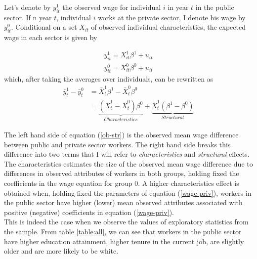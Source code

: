 \documentclass{article}
\begin{document}
\noindent
Let's denote by $y^{1}_{it}$ the observed wage for individual $i$ in year $t$ in the public sector. If n year $t$, individual $i$ works at the private sector, I denote his wage by $y^{0}_{it}$. Conditional on a set $X_{it}$ of observed individual characteristics, the expected wage in each sector is given by  

\begin{align}
    y_{it}^{1} = X_{it}^{1}\beta^{1}+u_{it}\\
    y_{it}^{0} = X_{it}^{0}\beta^{0}+u_{it} \label{wage-priv}
\end{align}
which, after taking the averages over individuals, can be rewritten as
\begin{align}
    \bar{y}_{t}^{1} - \bar{y}_{t}^{0} &= \bar{X}_{t}^{1}\beta^{1} -\bar{X}_{t}^{0}\beta^{0} \\
    &= \underbrace{\left(\bar{X}_{t}^{1}-\bar{X}_{t}^{0}\right)\beta^{0}}_{Characteristics} +\underbrace{\bar{X}_{t}^{1}\left(\beta^{1}-\beta^{0}\right)}_{Structural} \label{ob-str}
\end{align}      

\noindent
The left hand side of equation (\ref{ob-str}) is the observed mean wage difference between public and private sector workers. The right hand side breaks this difference into two terms that I will refer to \emph{characteristics} and \emph{structural} effects. The characteristics estimates the size of the observed mean wage difference due to differences in observed attributes of workers in both groups, holding fixed the coefficients in the wage equation for group $0$. A higher characteristics effect is obtained when, holding fixed the parameters of equation (\ref{wage-priv}), workers in the public sector have higher (lower) mean observed attributes associated with positive (negative) coefficients in equation (\ref{wage-priv}). \\

\noindent
This is indeed the case when we observe the values of exploratory statistics from the sample. From table \ref{table:all}, we can see that workers in the public sector have higher education attainment, higher tenure in the current job, are slightly older and are more likely to be white.   
\end{document}
